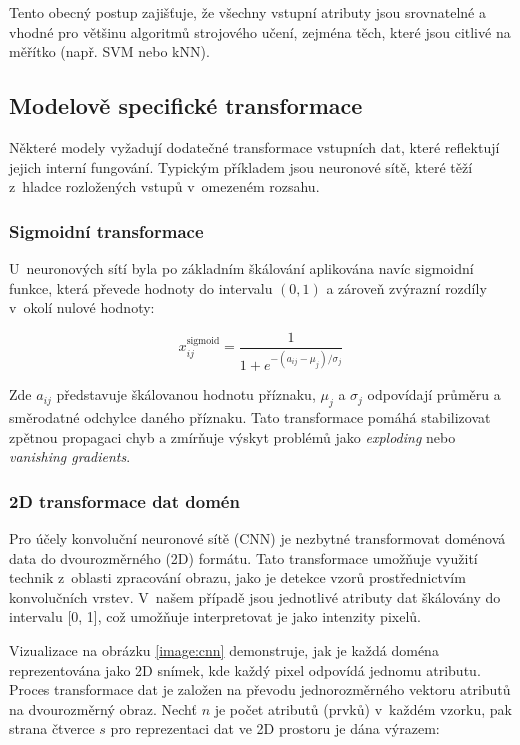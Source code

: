 Tento obecný postup zajišťuje, že všechny vstupní atributy jsou srovnatelné a vhodné pro většinu algoritmů strojového učení, zejména těch, které jsou citlivé na měřítko (např. SVM nebo kNN).

\subsection{Modelově specifické transformace}
Některé modely vyžadují dodatečné transformace vstupních dat, které reflektují jejich interní fungování. Typickým příkladem jsou neuronové sítě, které těží z~hladce rozložených vstupů v~omezeném rozsahu.

\subsubsection*{Sigmoidní transformace}
\label{sigmoid_transformation}
U~neuronových sítí byla po základním škálování aplikována navíc sigmoidní funkce, která převede hodnoty do intervalu $(0, 1)$ a zároveň zvýrazní rozdíly v~okolí nulové hodnoty:

\begin{equation}
    x_{ij}^{\text{sigmoid}} = \frac{1}{1 + e^{-(a_{ij} - \mu_j)/\sigma_j}}
\end{equation}

Zde $a_{ij}$ představuje škálovanou hodnotu příznaku, $\mu_j$ a $\sigma_j$ odpovídají průměru a směrodatné odchylce daného příznaku. Tato transformace pomáhá stabilizovat zpětnou propagaci chyb a zmírňuje výskyt problémů jako \textit{exploding} nebo \textit{vanishing gradients}.


\subsubsection*{2D transformace dat domén}
\label{2d_transformation}

Pro účely konvoluční neuronové sítě (CNN) je nezbytné transformovat doménová data do dvourozměrného (2D) formátu. Tato transformace umožňuje využití technik z~oblasti zpracování obrazu, jako je detekce vzorů prostřednictvím konvolučních vrstev. V~našem případě jsou jednotlivé atributy dat škálovány do intervalu [0, 1], což umožňuje interpretovat je jako intenzity pixelů. 

Vizualizace na obrázku \ref{image:cnn} demonstruje, jak je každá doména reprezentována jako 2D snímek, kde každý pixel odpovídá jednomu atributu. Proces transformace dat je založen na převodu jednorozměrného vektoru atributů na dvourozměrný obraz. Nechť $n$ je počet atributů (prvků) v~každém vzorku, pak strana čtverce $s$ pro reprezentaci dat ve 2D prostoru je dána výrazem:

